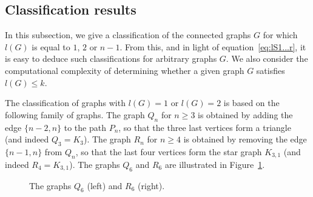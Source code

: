 \documentclass[ALCO,ThmDefs,Unicode,epreuves]{cedram}
\newcommand{\edge}[2]{\draw (#1) -- (#2);}
\begin{document}
\subsection{Classification results}
In this subsection, we give a classification of the connected
graphs $G$ for which $l(G)$ is equal to $1$, $2$ or $n-1$. From this, and in
light of equation~\eqref{eq:lS1...r}, it is easy to deduce such classifications
for arbitrary graphs $G$. We also consider the computational complexity of
determining whether a given graph $G$ satisfies $l(G)\leq k$. 

The classification of graphs with $l(G) = 1$ or $l(G) = 2$ is based on the
following family of graphs. The graph $Q_n$ for $n \ge 3$ is obtained by adding
the edge $\{n-2, n\}$ to the path $P_n$, so that the three last vertices form a
triangle (and indeed $Q_3 = K_3$). The graph $R_n$ for $n \ge 4$ is obtained by
removing the edge $\{n-1, n\}$ from $Q_n$, so that the last four vertices form
the star graph $K_{3,1}$ (and indeed $R_4 = K_{3,1}$). The graphs $Q_6$ and $R_6$ are illustrated
in Figure~\ref{fig:Q6R6}.

\begin{figure}[ht]
\centering
{}
\caption{The graphs $Q_6$ (left) and $R_6$ (right).} \label{fig:Q6R6}
\end{figure}
\end{document}
